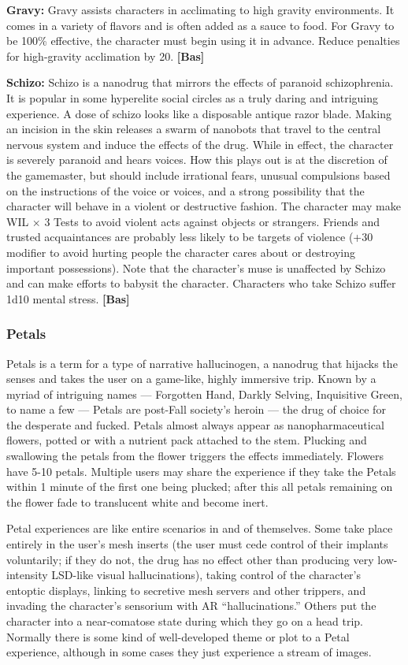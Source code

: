 {{\textbf{Gravy:} Gravy assists characters in acclimating to high gravity environments. It comes in a variety of flavors and is often added as a sauce to food. For Gravy to be 100\% effective, the character must begin using it in advance. Reduce penalties for high-gravity acclimation by 20. \textbf{[Bas]} 

\textbf{Schizo:} Schizo is a nanodrug that mirrors the effects of paranoid schizophrenia. It is popular in some hyperelite social circles as a truly daring and intriguing experience. A dose of schizo looks like a disposable antique razor blade. Making an incision in the skin releases a swarm of nanobots that travel to the central nervous system and induce the effects of the drug. While in effect, the character is severely paranoid and hears voices. How this plays out is at the discretion of the gamemaster, but should include irrational fears, unusual compulsions based on the instructions of the voice or voices, and a strong possibility that the character will behave in a violent or destructive fashion. The character may make WIL $\times$ 3 Tests to avoid violent acts against objects or strangers. Friends and trusted acquaintances are probably less likely to be targets of violence (+30 modifier to avoid hurting people the character cares about or destroying important possessions). Note that the character’s muse is unaffected by Schizo and can make efforts to babysit the character. Characters who take Schizo suffer 1d10 mental stress. \textbf{[Bas]} 

\subsubsection{Petals} 

Petals is a term for a type of narrative hallucinogen, a nanodrug that hijacks the senses and takes the user on a game-like, highly immersive trip. Known by a myriad of intriguing names --- Forgotten Hand, Darkly Selving, Inquisitive Green, to name a few --- Petals are post-Fall society’s heroin --- the drug of choice for the desperate and fucked. Petals almost always appear as nanopharmaceutical flowers, potted or with a nutrient pack attached to the stem. Plucking and swallowing the petals from the flower triggers the effects immediately. Flowers have 5-10 petals. Multiple users may share the experience if they take the Petals within 1 minute of the first one being plucked; after this all petals remaining on the flower fade to translucent white and become inert. 

Petal experiences are like entire scenarios in and of themselves. Some take place entirely in the user’s mesh inserts (the user must cede control of their implants voluntarily; if they do not, the drug has no effect other than producing very low-intensity LSD-like visual hallucinations), taking control of the character’s entoptic displays, linking to secretive mesh servers and other trippers, and invading the character’s sensorium with AR ``hallucinations.'' Others put the character into a near-comatose state during which they go on a head trip. Normally there is some kind of well-developed theme or plot to a Petal experience, although in some cases they just experience a stream of images. 

}}
